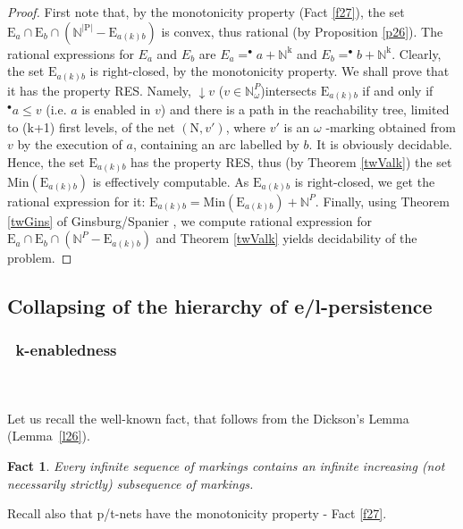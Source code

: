 \documentclass[a4paper]{llncs}
\newtheorem{fact}{Fact}
\begin{document}
\begin{proof}
First note that, by the monotonicity property (Fact \ref{f27}), the set \newline$\mathrm{E}_a\cap \mathrm{E}_b\cap (\mathbb{N}^{|\mathrm{P}|}-\mathrm{E}_{a(k)b})$ is convex, thus rational (by Proposition \ref{p26}). The rational expressions for $E_a$ and $E_b$ are  $E_a=^\bullet a+\mathbb{N}^\mathrm{k}$ and $E_b=^\bullet b+\mathbb{N}^\mathrm{k}$. Clearly, the set $\mathrm{E}_{a(k)b}$ is right-closed, by the monotonicity property. We shall prove that it has the property RES. Namely, $\downarrow\!v$ ($v\in\mathbb{N}_\omega^{P}$)intersects $\mathrm{E}_{a(k)b}$ if and only if $^\bullet a\leq v$ (i.e. $a$ is enabled in $v$) and there is a path in the reachability tree, limited to (k+1) first levels, of the net $(\mathrm{N}, v')$, where $v'$ is an $\omega$ -marking obtained from $v$ by the execution of $a$, containing an arc labelled by $b$. It is obviously decidable. Hence, the set $\mathrm{E}_{a(k)b}$ has the property RES, thus (by Theorem \ref{twValk}) the set $\mathrm{Min}(\mathrm{E}_{a(k)b})$ is effectively computable. As $\mathrm{E}_{a(k)b}$ is right-closed, we get the rational expression for it: $\mathrm{E}_{a(k)b} = \mathrm{Min}(\mathrm{E}_{a(k)b})+\mathbb{N}^{P}$. Finally, using Theorem \ref{twGins} of Ginsburg/Spanier \cite{GinsburgSpanier}, we compute rational expression for $\mathrm{E}_a\cap \mathrm{E}_b \cap (\mathbb{N}^{P}-\mathrm{E}_{a(k)b})$ and Theorem \ref{twValk} yields decidability of the problem. 	
\end{proof}

\subsection{Collapsing of the hierarchy of e/l-persistence}


\subsubsection{\textbullet \ k-enabledness}\mbox{ }\\
\\
Let us recall the well-known fact, that follows from the Dickson's Lemma (Lemma~\ref{l26}).

\begin{fact}
\label{f47}
Every infinite sequence of markings contains an infinite increasing (not necessarily strictly) subsequence of markings.
\end{fact}
Recall also that p/t-nets have the monotonicity property - Fact \ref{f27}.
\end{document}
